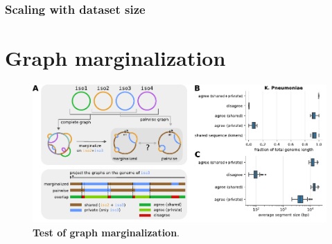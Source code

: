 \documentclass[aps,rmp,reprint,superscriptaddress,notitlepage,10pt]{revtex4-1}
\begin{document}
\subsubsection*{Scaling with dataset size}


\section{Graph marginalization}

\begin{figure}[htb]
    \includegraphics[width=\textwidth]{figs/marginalize_test.pdf}
    \caption{{\bf Test of graph marginalization}.}
    \label{fig:marginalization}
\end{figure}


\end{document}
